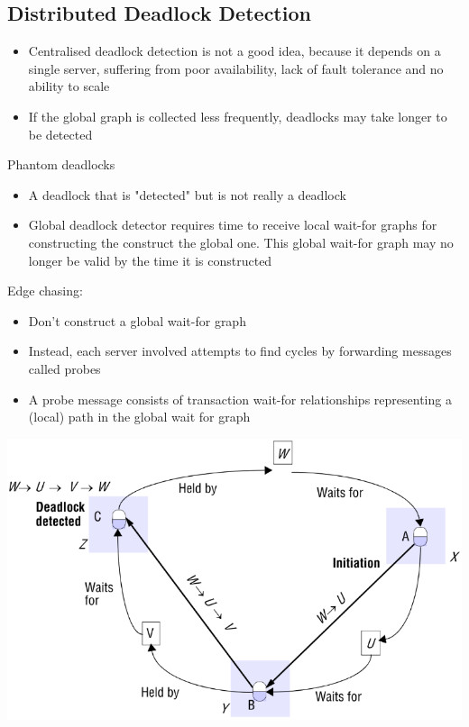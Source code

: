 \documentclass{article}[18pt]
\begin{document}
\subsection{Distributed Deadlock Detection}
\begin{itemize}
	\item Centralised deadlock detection is not a good idea, because it depends on a single server, suffering from poor availability, lack of fault tolerance and no ability to scale
	\item If the global graph is collected less frequently, deadlocks may take longer to be detected
\end{itemize}
Phantom deadlocks
\begin{itemize}
	\item A deadlock that is "detected" but is not really a deadlock
	\item Global deadlock detector requires time to receive local wait-for graphs for constructing the construct the global one. This global wait-for graph may no longer be valid by the time it is constructed
\end{itemize}
Edge chasing:
\begin{itemize}
	\item Don't construct a global wait-for graph
	\item Instead, each server involved attempts to find cycles by forwarding messages called probes
	\item A probe message consists of transaction wait-for relationships representing a (local) path in the global wait for graph
\end{itemize}
\begin{center}
	\includegraphics[scale=0.7]{"Edge Chasing"}
\end{center}
\end{document}
